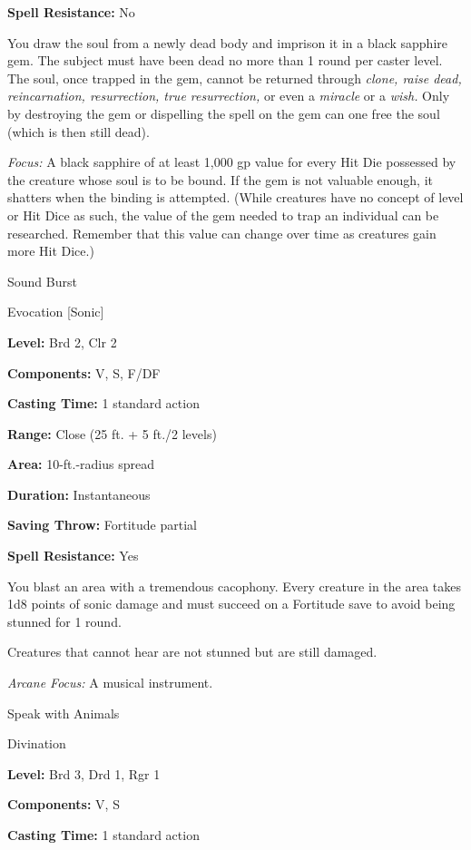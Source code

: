 \documentclass{article}
\begin{document}
\textbf{Spell Resistance:} No

You draw the soul from a newly dead body and imprison it in a black sapphire gem. 
The subject must have been dead no more than 1 round per caster level. The soul, 
once trapped in the gem, cannot be returned through \textit{clone, raise dead, 
reincarnation, resurrection, true resurrection, }or even a \textit{miracle }or 
a \textit{wish. }Only by destroying the gem or dispelling the spell on the gem 
can one free the soul (which is then still dead).

\textit{Focus: }A black sapphire of at least 1,000 gp value for every Hit Die possessed 
by the creature whose soul is to be bound. If the gem is not valuable enough, it 
shatters when the binding is attempted. (While creatures have no concept of level 
or Hit Dice as such, the value of the gem needed to trap an individual can be researched. 
Remember that this value can change over time as creatures gain more Hit Dice.)

\vspace{12pt}
Sound Burst

Evocation [Sonic]

\textbf{Level:} Brd 2, Clr 2

\textbf{Components:} V, S, F/DF

\textbf{Casting Time:} 1 standard action

\textbf{Range:} Close (25 ft. + 5 ft./2 levels)

\textbf{Area:} 10-ft.-radius spread

\textbf{Duration:} Instantaneous

\textbf{Saving Throw:} Fortitude partial

\textbf{Spell Resistance:} Yes

You blast an area with a tremendous cacophony. Every creature in the area takes 
1d8 points of sonic damage and must succeed on a Fortitude save to avoid being 
stunned for 1 round. 

Creatures that cannot hear are not stunned but are still damaged.

\textit{Arcane Focus: }A musical instrument.

\vspace{12pt}
Speak with Animals

Divination

\textbf{Level:} Brd 3, Drd 1, Rgr 1

\textbf{Components:} V, S

\textbf{Casting Time:} 1 standard action
\end{document}
